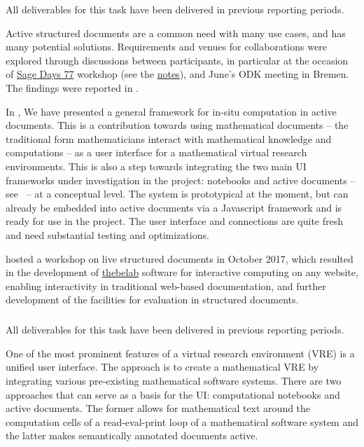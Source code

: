 All deliverables for this task have been delivered in previous reporting periods.


Active structured documents are a common need with many use cases, and has many potential solutions.
Requirements and venues for collaborations were explored through discussions between participants,
in particular at the occasion of \href{https://wiki.sagemath.org/days77/}{Sage Days 77} workshop
(see the \href{https://wiki.sagemath.org/days77/live-structured-documents}{notes}), and June's ODK
meeting in Bremen. The findings were reported in .

In , We have presented a general framework for in-situ computation in active documents. This is
a contribution towards using mathematical documents -- the traditional form mathematicians
interact with mathematical knowledge and computations -- as a user interface for a
mathematical virtual research environments. This is also a step towards integrating the
two main UI frameworks under investigation in the \ODK project: \Jupyter notebooks and
active documents -- see~ -- at a conceptual level. The system is
prototypical at the moment, but can already be embedded into active documents via a
Javascript framework and is ready for use in the \ODK project. The user interface and \SCSCP
connections are quite fresh and need substantial testing and optimizations.

\ODK hosted a workshop on live structured documents in October 2017,
which resulted in the development of \href{https://github.com/minrk/thebelab}{thebelab} software for interactive computing on any website,
enabling interactivity in traditional web-based documentation,
and further development of the \MathHub facilities for evaluation in structured documents.

\subparagraph{}
\label{UI@mathhub}

All deliverables for this task have been delivered in previous reporting periods.


One of the most prominent features of a virtual research environment (VRE) is a unified user interface. The \ODK approach is to create a mathematical VRE by integrating various pre-existing mathematical software systems. There are two approaches that can serve as a basis for the \ODK UI: computational notebooks and active documents. The former allows for mathematical text around the computation cells of a read-eval-print loop of a mathematical software system and the latter makes semantically annotated documents active.

